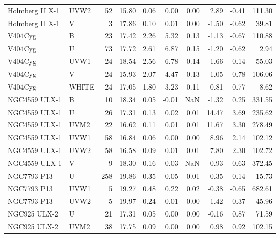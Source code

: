 \begin{tabular}{llrrrrrrrr}
   Holmberg II X-1 &   UVW2 &     52 & 15.80 & 0.06 &      0.00 &   0.00 &      2.89 & -0.41 &       111.30 \\
   Holmberg II X-1 &      V &      3 & 17.86 & 0.10 &      0.01 &   0.00 &     -1.50 & -0.62 &        39.81 \\
           V404Cyg &      B &     23 & 17.42 & 2.26 &      5.32 &   0.13 &     -1.13 & -0.67 &       110.88 \\
           V404Cyg &      U &     73 & 17.72 & 2.61 &      6.87 &   0.15 &     -1.20 & -0.62 &         2.94 \\
           V404Cyg &   UVW1 &     24 & 18.54 & 2.56 &      6.78 &   0.14 &     -1.66 & -0.14 &        55.03 \\
           V404Cyg &      V &     24 & 15.93 & 2.07 &      4.47 &   0.13 &     -1.05 & -0.78 &       106.06 \\
           V404Cyg &  WHITE &     24 & 17.05 & 1.80 &      3.23 &   0.11 &     -0.81 & -0.77 &         8.62 \\
     NGC4559 ULX-1 &      B &     10 & 18.34 & 0.05 &     -0.01 &    NaN &     -1.32 &  0.25 &       331.55 \\
     NGC4559 ULX-1 &      U &     26 & 17.31 & 0.13 &      0.02 &   0.01 &     14.47 &  3.69 &       235.62 \\
     NGC4559 ULX-1 &   UVM2 &     22 & 16.62 & 0.11 &      0.01 &   0.01 &     11.67 &  3.30 &       278.49 \\
     NGC4559 ULX-1 &   UVW1 &     58 & 16.84 & 0.06 &      0.00 &   0.00 &      8.96 &  2.14 &       102.12 \\
     NGC4559 ULX-1 &   UVW2 &     58 & 16.58 & 0.09 &      0.01 &   0.01 &      7.80 &  2.30 &       102.72 \\
     NGC4559 ULX-1 &      V &      9 & 18.30 & 0.16 &     -0.03 &    NaN &     -0.93 & -0.63 &       372.45 \\
       NGC7793 P13 &      U &    258 & 19.86 & 0.35 &      0.05 &   0.01 &     -0.35 & -0.14 &        15.73 \\
       NGC7793 P13 &   UVW1 &      5 & 19.27 & 0.48 &      0.22 &   0.02 &     -0.38 & -0.65 &       682.61 \\
       NGC7793 P13 &   UVW2 &      5 & 19.97 & 0.24 &      0.01 &   0.00 &     -1.42 & -0.37 &        45.96 \\
      NGC925 ULX-2 &      U &     21 & 17.31 & 0.05 &      0.00 &   0.00 &     -0.16 &  0.87 &        71.59 \\
      NGC925 ULX-2 &   UVM2 &     38 & 17.75 & 0.09 &      0.00 &   0.00 &      0.98 &  0.92 &       102.15 \\

\end{tabular}
